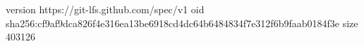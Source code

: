 version https://git-lfs.github.com/spec/v1
oid sha256:cf9af9dca826f4e316ea13be6918cd4dc64b6484834f7e312f6b9faab0184f3e
size 403126
